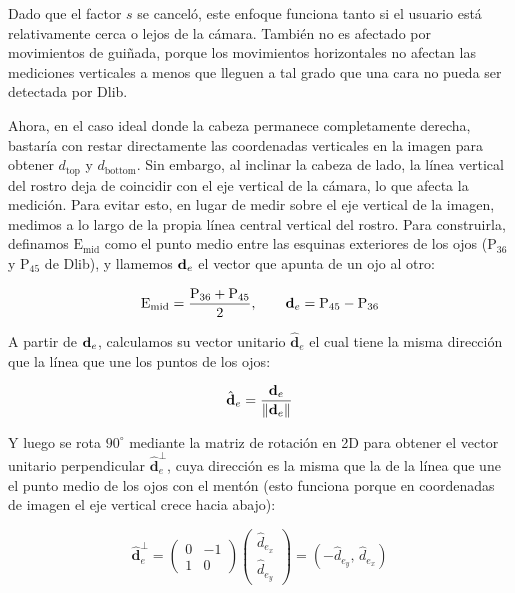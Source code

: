 Dado que el factor $s$ se canceló, este enfoque funciona tanto si el usuario está relativamente cerca o lejos de la cámara. También no es afectado por movimientos de guiñada, porque los movimientos horizontales no afectan las mediciones verticales a menos que lleguen a tal grado que una cara no pueda ser detectada por Dlib. 

Ahora, en el caso ideal donde la cabeza permanece completamente derecha, bastaría con restar directamente las coordenadas verticales en la imagen para obtener $d_{\mathrm{top}}$ y $d_{\mathrm{bottom}}$. Sin embargo, al inclinar la cabeza de lado, la línea vertical del rostro deja de coincidir con el eje vertical de la cámara, lo que afecta la medición. Para evitar esto, en lugar de medir sobre el eje vertical de la imagen, medimos a lo largo de la propia línea central vertical del rostro. Para construirla, definamos $\mathrm{E}_{\mathrm{mid}}$ como el punto medio entre las esquinas exteriores de los ojos ($\mathrm{P}_{36}$ y $\mathrm{P}_{45}$ de Dlib), y llamemos $\mathbf{d}_e$ el vector que apunta de un ojo al otro:

\begin{equation}
\mathrm{E}_{\mathrm{mid}} = \frac{\mathrm{P}_{36} + \mathrm{P}_{45}}{2}, \qquad
\mathbf{d}_e = \mathrm{P}_{45} - \mathrm{P}_{36}
\label{eq:e_mid_d_e}
\end{equation}

A partir de $\mathbf{d}_e$, calculamos su vector unitario $\hat{\mathbf{d}}_e$ el cual tiene la misma dirección que la línea que une los puntos de los ojos:

\begin{equation}
\hat{\mathbf{d}}_e = \frac{\mathbf{d}_e}{\|\mathbf{d}_e\|}
\label{eq:d_e_unit}
\end{equation}

Y luego se rota $90^\circ$ mediante la matriz de rotación en 2D para obtener el vector unitario perpendicular $\hat{\mathbf{d}}_e^\perp$, cuya dirección es la misma que la de la línea que une el punto medio de los ojos con el mentón (esto funciona porque en coordenadas de imagen el eje vertical crece hacia abajo):

\begin{equation}
\hat{\mathbf{d}}_e^\perp =
\begin{pmatrix}
0 & -1 \\
1 & 0
\end{pmatrix}
\begin{pmatrix}
\hat{d}_{e_x} \\
\hat{d}_{e_y}
\end{pmatrix}
= (-\hat{d}_{e_y},\, \hat{d}_{e_x})
\label{eq:d_e_perp}
\end{equation}

